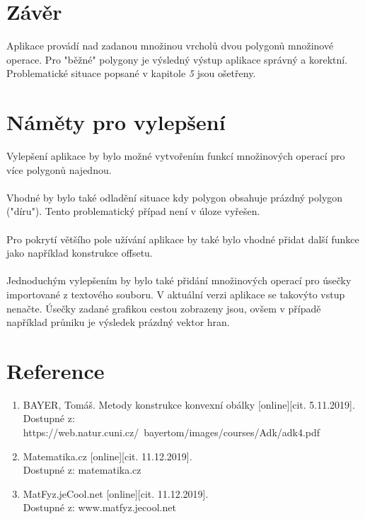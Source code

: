 \documentclass[a4paper, 12pt]{article}
\begin{document}
\section{Závěr}
Aplikace provádí nad zadanou množinou vrcholů dvou polygonů množinové operace. Pro "běžné" polygony je výsledný výstup aplikace správný a korektní. Problematické situace popsané v kapitole \textit{5} jsou ošetřeny.  

\section{Náměty pro vylepšení} 
Vylepšení aplikace by bylo možné vytvořením funkcí množinových operací pro více polygonů najednou.\\
\\
Vhodné by bylo také odladění situace kdy polygon obsahuje prázdný polygon ("díru"). Tento problematický případ není v úloze vyřešen.\\
\\
Pro pokrytí většího pole užívání aplikace by také bylo vhodné přidat další funkce jako například konstrukce offsetu.\\
\\
Jednoduchým vylepšením by bylo také přidání množinových operací pro úsečky importované z textového souboru. V aktuální verzi aplikace se takovýto vstup nenačte. Úsečky zadané grafikou cestou zobrazeny jsou, ovšem v případě například průniku je výsledek prázdný vektor hran. 

\section{Reference}

\begin{enumerate}

\item  BAYER, Tomáš. Metody konstrukce konvexní obálky [online][cit. 5.11.2019]. \\
Dostupné z: https://web.natur.cuni.cz/~bayertom/images/courses/Adk/adk4.pdf \\

\item  Matematika.cz [online][cit. 11.12.2019]. \\
Dostupné z: matematika.cz\\

\item  MatFyz.jeCool.net [online][cit. 11.12.2019]. \\
Dostupné z: www.matfyz.jecool.net\\


\end{enumerate}
\end{document}
